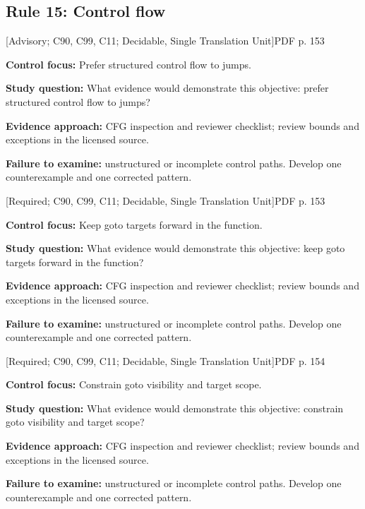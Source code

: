 \documentclass[10pt,letterpaper]{article}
\begin{document}
\subsection{Rule 15: Control flow}
 \textsf{\footnotesize [Advisory; C90, C99, C11; Decidable, Single Translation Unit]}\hfill{\footnotesize PDF p. 153}\par
\textbf{Control focus:} Prefer structured control flow to jumps.\par
\textbf{Study question:} What evidence would demonstrate this objective: prefer structured control flow to jumps?\par
\textbf{Evidence approach:} CFG inspection and reviewer checklist; review bounds and exceptions in the licensed source.\par
\textbf{Failure to examine:} unstructured or incomplete control paths. Develop one counterexample and one corrected pattern.\par
\smallskip
{}
 \textsf{\footnotesize [Required; C90, C99, C11; Decidable, Single Translation Unit]}\hfill{\footnotesize PDF p. 153}\par
\textbf{Control focus:} Keep goto targets forward in the function.\par
\textbf{Study question:} What evidence would demonstrate this objective: keep goto targets forward in the function?\par
\textbf{Evidence approach:} CFG inspection and reviewer checklist; review bounds and exceptions in the licensed source.\par
\textbf{Failure to examine:} unstructured or incomplete control paths. Develop one counterexample and one corrected pattern.\par
\smallskip
{}
 \textsf{\footnotesize [Required; C90, C99, C11; Decidable, Single Translation Unit]}\hfill{\footnotesize PDF p. 154}\par
\textbf{Control focus:} Constrain goto visibility and target scope.\par
\textbf{Study question:} What evidence would demonstrate this objective: constrain goto visibility and target scope?\par
\textbf{Evidence approach:} CFG inspection and reviewer checklist; review bounds and exceptions in the licensed source.\par
\textbf{Failure to examine:} unstructured or incomplete control paths. Develop one counterexample and one corrected pattern.\par
\end{document}
